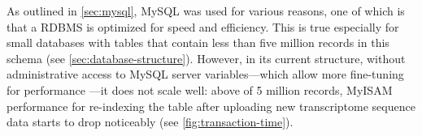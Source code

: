 \label{sec:mysql-performance}
As outlined in \autoref{sec:mysql}, MySQL was used for various reasons, one of
which is that a RDBMS is optimized for speed and efficiency. This is true
especially for small databases with tables that contain less than five million
records in this schema (see \autoref{sec:database-structure}). However, in its
current structure, without administrative access to MySQL server
variables---which allow more fine-tuning for performance
\citep{schwartz2012}---it does not scale well: above of 5 million records,
MyISAM performance for re-indexing the table after uploading new transcriptome
sequence data starts to drop noticeably (see \autoref{fig:transaction-time}). 




